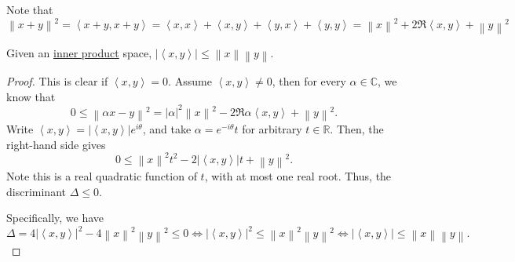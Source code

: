 \begin{note}
	Note that
	\[
		\left\lVert x + y\right\rVert^2
		= \left< x + y, x + y \right>
		= \left< x,x \right> + \left< x,y \right>  + \left< y,x \right>  + \left< y,y \right>
		= \left\lVert x\right\rVert^2 + 2\Re \left< x,y \right> + \left\lVert y\right\rVert^2
	\]
\end{note}

\begin{theorem}\label{thm:Cauchy-Schwarz-inequality}
	Given an \hyperref[def:inner-product]{inner product} space, \(\left\vert \left< x,y \right> \right\vert \leq \left\lVert x\right\rVert \left\lVert y\right\rVert\).
\end{theorem}
\begin{proof}
	This is clear if \(\left< x,y \right> = 0\). Assume \(\left< x,y \right> \neq 0\), then for every \(\alpha \in \mathbb{C}\), we know that
	\[
		0 \leq \left\lVert \alpha x - y\right\rVert^2 = \left\vert \alpha \right\vert^2\left\lVert x\right\rVert^2 - 2\Re \alpha\left< x,y \right> + \left\lVert y\right\rVert^2.
	\]
	Write \(\left< x,y \right> = \left\vert \left< x,y \right> \right\vert e^{i\theta}\), and take \(\alpha = e^{-i\theta}t\) for arbitrary \(t \in \mathbb{R}\).
	Then, the right-hand side gives
	\[
		0 \leq \left\lVert x\right\rVert^2t^2 - 2 \left\vert \left< x,y \right> \right\vert t + \left\lVert y\right\rVert^2.
	\]
	Note this is a real quadratic function of \(t\), with at most one real root. Thus, the discriminant \(\Delta \leq 0\).

	Specifically, we have
	\[
		\Delta = 4\left\vert \left< x,y \right> \right\vert^2 - 4\left\lVert x\right\rVert^2 \left\lVert y\right\rVert^2  \leq 0
		\iff \left\vert \left< x,y \right> \right\vert^2\leq \left\lVert x\right\rVert^2 \left\lVert y\right\rVert^2
		\iff \left\vert \left< x,y \right> \right\vert\leq \left\lVert x\right\rVert\left\lVert y\right\rVert.
	\]
\end{proof}

